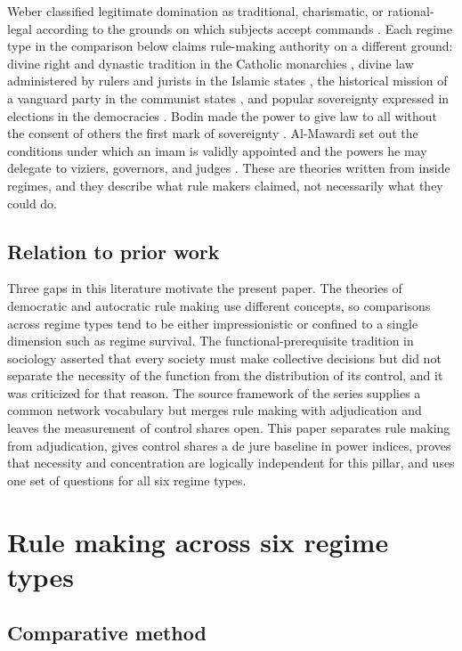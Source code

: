 \documentclass[11pt,letterpaper]{article}
\theoremstyle{definition}
\theoremstyle{remark}
\begin{document}
Weber classified legitimate domination as traditional, charismatic, or rational-legal according to the grounds on which subjects accept commands \citep{weber1978}. Each regime type in the comparison below claims rule-making authority on a different ground: divine right and dynastic tradition in the Catholic monarchies \citep{figgis1914,kantorowicz1957}, divine law administered by rulers and jurists in the Islamic states \citep{crone2004,lambton1981}, the historical mission of a vanguard party in the communist states \citep{kornai1992}, and popular sovereignty expressed in elections in the democracies \citep{dahl1971}. Bodin made the power to give law to all without the consent of others the first mark of sovereignty \citep{bodin1992}. Al-Mawardi set out the conditions under which an imam is validly appointed and the powers he may delegate to viziers, governors, and judges \citep{mawardi1996}. These are theories written from inside regimes, and they describe what rule makers claimed, not necessarily what they could do.

\subsection{Relation to prior work}

Three gaps in this literature motivate the present paper. The theories of democratic and autocratic rule making use different concepts, so comparisons across regime types tend to be either impressionistic or confined to a single dimension such as regime survival. The functional-prerequisite tradition in sociology asserted that every society must make collective decisions \citep{aberle1950,parsons1951} but did not separate the necessity of the function from the distribution of its control, and it was criticized for that reason. The source framework of the series \citep{largo2026hbs} supplies a common network vocabulary but merges rule making with adjudication and leaves the measurement of control shares open. This paper separates rule making from adjudication, gives control shares a de jure baseline in power indices, proves that necessity and concentration are logically independent for this pillar, and uses one set of questions for all six regime types.

\section{Rule making across six regime types}
\label{sec:regimes}

\subsection{Comparative method}
\end{document}

